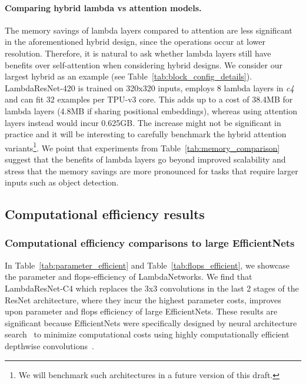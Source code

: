 \documentclass{article} \usepackage{iclr2021_conference,times}
\begin{document}
\paragraph{Comparing hybrid lambda vs attention models.}
The memory savings of lambda layers compared to attention are less significant in the aforementioned hybrid design, since the operations occur at lower resolution.
Therefore, it is natural to ask whether lambda layers still have benefits over self-attention when considering hybrid designs.
We consider our largest hybrid as an example (see Table~\ref{tab:block_config_details}).
LambdaResNet-420 is trained on 320x320 inputs, employs 8 lambda layers in \emph{c4} and can fit 32 examples per TPU-v3 core.
This adds up to a cost of 38.4MB for lambda layers (4.8MB if sharing positional embeddings), whereas using attention layers instead would incur 0.625GB.
The increase might not be significant in practice and it will be interesting to carefully benchmark the hybrid attention variants\footnote{We will benchmark such architectures in a future version of this draft.}.
We point that experiments from Table~\ref{tab:memory_comparison} suggest that the benefits of lambda layers go beyond improved scalability and stress that the memory savings are more pronounced for tasks that require larger inputs such as object detection.

\subsection{Computational efficiency results}
\subsubsection{Computational efficiency comparisons to large EfficientNets}
In Table~\ref{tab:parameter_efficient} and Table~\ref{tab:flops_efficient}, we showcase the parameter and flops-efficiency of LambdaNetworks.
We find that LambdaResNet-C4 which replaces the 3x3 convolutions in the last 2 stages of the ResNet architecture, where they incur the highest parameter costs, improves upon parameter and flops efficiency of large EfficientNets.
These results are significant because EfficientNets were specifically designed by neural architecture search~\citep{zoph2017neural} to minimize computational costs using highly computationally efficient depthwise convolutions~\citep{tan2019efficientnet}.
\end{document}
